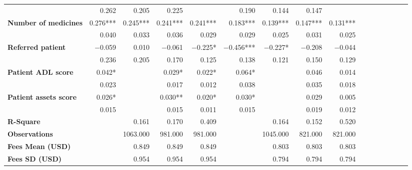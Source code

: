 \begin{tabular}{@{\extracolsep{5pt}}lrrrrrrrrrrrrrrr}
{\bf } & 0.262\phantom{***} & 0.205\phantom{***} & 0.225\phantom{***} & \phantom{***} & 0.190\phantom{***} & 0.144\phantom{***} & 0.147\phantom{***} & \phantom{***} \\
{\bf Number of medicines} & 0.276*** & 0.245*** & 0.241*** & 0.241*** & 0.183*** & 0.139*** & 0.147*** & 0.131*** \\
{\bf } & 0.040\phantom{***} & 0.033\phantom{***} & 0.036\phantom{***} & 0.029\phantom{***} & 0.029\phantom{***} & 0.025\phantom{***} & 0.031\phantom{***} & 0.025\phantom{***} \\
{\bf Referred patient} & $-$0.059\phantom{***} & 0.010\phantom{***} & $-$0.061\phantom{***} & $-$0.225*\phantom{**} & $-$0.456*** & $-$0.227*\phantom{**} & $-$0.208\phantom{***} & $-$0.044\phantom{***} \\
{\bf } & 0.236\phantom{***} & 0.205\phantom{***} & 0.170\phantom{***} & 0.125\phantom{***} & 0.138\phantom{***} & 0.121\phantom{***} & 0.150\phantom{***} & 0.129\phantom{***} \\
{\bf Patient ADL score} & 0.042*\phantom{**} & \phantom{***} & 0.029*\phantom{**} & 0.022*\phantom{**} & 0.064*\phantom{**} & \phantom{***} & 0.046\phantom{***} & 0.014\phantom{***} \\
{\bf } & 0.023\phantom{***} & \phantom{***} & 0.017\phantom{***} & 0.012\phantom{***} & 0.038\phantom{***} & \phantom{***} & 0.035\phantom{***} & 0.018\phantom{***} \\
{\bf Patient assets score} & 0.026*\phantom{**} & \phantom{***} & 0.030**\phantom{*} & 0.020*\phantom{**} & 0.030*\phantom{**} & \phantom{***} & 0.029\phantom{***} & 0.005\phantom{***} \\
{\bf } & 0.015\phantom{***} & \phantom{***} & 0.015\phantom{***} & 0.011\phantom{***} & 0.015\phantom{***} & \phantom{***} & 0.019\phantom{***} & 0.012\phantom{***} \\
{\bf R-Square} & \phantom{***} & 0.161\phantom{***} & 0.170\phantom{***} & 0.409\phantom{***} & \phantom{***} & 0.164\phantom{***} & 0.152\phantom{***} & 0.520\phantom{***} \\
{\bf Observations} & \phantom{***} & 1063.000\phantom{***} & 981.000\phantom{***} & 981.000\phantom{***} & \phantom{***} & 1045.000\phantom{***} & 821.000\phantom{***} & 821.000\phantom{***} \\
{\bf Fees Mean (USD)} & \phantom{***} & 0.849\phantom{***} & 0.849\phantom{***} & 0.849\phantom{***} & \phantom{***} & 0.803\phantom{***} & 0.803\phantom{***} & 0.803\phantom{***} \\
{\bf Fees SD (USD)} & \phantom{***} & 0.954\phantom{***} & 0.954\phantom{***} & 0.954\phantom{***} & \phantom{***} & 0.794\phantom{***} & 0.794\phantom{***} & 0.794\phantom{***} \\
\hline
\end{tabular}
